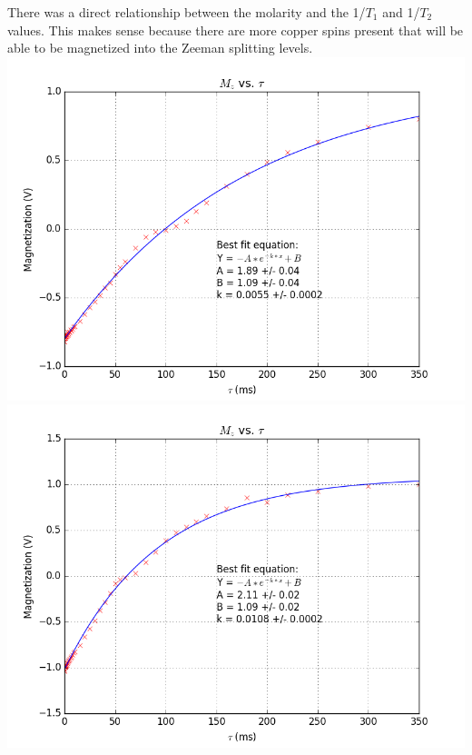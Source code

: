 \documentclass{article}
\begin{document}
{\begin{multicols}{2}
There was a direct relationship between the molarity and the 1/$T_1$ and 1/$T_2$
 values. This makes sense because there are more copper spins present that will be able to be magnetized into the Zeeman splitting levels.
\center
\includegraphics[width=\linewidth]{pic-for-report/a0005M-CuSO4-T1.png}
\label{fig:20}
\includegraphics[width=\linewidth]{pic-for-report/a0010M-CuSO4-T1.png}
\label{fig:21}

\end{multicols}}
\end{document}
